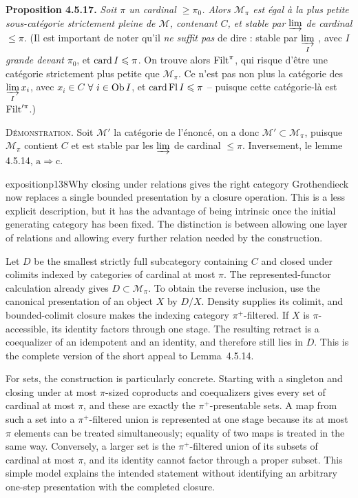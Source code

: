 \textbf{Proposition 4.5.17.} \textit{Soit $\pi$ un cardinal $\geqslant \pi_0$. Alors $\mathcal{M}_{\pi}$ est égal à la plus petite sous-catégorie strictement pleine de $\mathcal{M}$, contenant $C$, et stable par} $\varinjlim$ \textit{de cardinal $\leqslant \pi$.} (Il est important de noter qu'il \textit{ne suffit pas} de dire : stable par $\varinjlim\limits_{I}$ , avec \textit{$I$ grande devant} $\pi_0$, et $\operatorname{card} I \leqslant \pi$. On trouve alors $\operatorname{Filt}^{\pi}$, qui risque d'être une catégorie strictement plus petite que $\mathcal{M}_{\pi}$. Ce n'est pas non plus la catégorie des $\varinjlim\limits_{I} x_i$, avec $x_i \in C$ $\forall\ i \in \operatorname{Ob} I$, et $\operatorname{card} \operatorname{Fl} I \leqslant \pi$ -- puisque cette catégorie-là est $\operatorname{Filt}'^{\pi}$.)

\textsc{Démonstration}. Soit $\mathcal{M}'$ la catégorie de l'énoncé, on a donc $\mathcal{M}' \subset \mathcal{M}_{\pi}$, puisque $\mathcal{M}_{\pi}$ contient $C$ et est stable par les $\varinjlim$ de cardinal $\leqslant \pi$. Inversement, le lemme 4.5.14, $\mathrm{a} \Longrightarrow \mathrm{c}$.



\begin{dcomment}{exposition}{p138}{Why closing under relations gives the right category}
Grothendieck now replaces a single bounded presentation by a closure operation. This is a less explicit description, but it has the advantage of being intrinsic once the initial generating category has been fixed. The distinction is between allowing one layer of relations and allowing every further relation needed by the construction.

Let $D$ be the smallest strictly full subcategory containing $C$ and closed under colimits indexed by categories of cardinal at most $\pi$. The represented-functor calculation already gives $D\subset\mathcal M_\pi$. To obtain the reverse inclusion, use the canonical presentation of an object $X$ by $D/X$. Density supplies its colimit, and bounded-colimit closure makes the indexing category $\pi^+$-filtered. If $X$ is $\pi$-accessible, its identity factors through one stage. The resulting retract is a coequalizer of an idempotent and an identity, and therefore still lies in $D$. This is the complete version of the short appeal to Lemma~4.5.14.

For sets, the construction is particularly concrete. Starting with a singleton and closing under at most $\pi$-sized coproducts and coequalizers gives every set of cardinal at most $\pi$, and these are exactly the $\pi^+$-presentable sets. A map from such a set into a $\pi^+$-filtered union is represented at one stage because its at most $\pi$ elements can be treated simultaneously; equality of two maps is treated in the same way. Conversely, a larger set is the $\pi^+$-filtered union of its subsets of cardinal at most $\pi$, and its identity cannot factor through a proper subset. This simple model explains the intended statement without identifying an arbitrary one-step presentation with the completed closure.
\end{dcomment}


